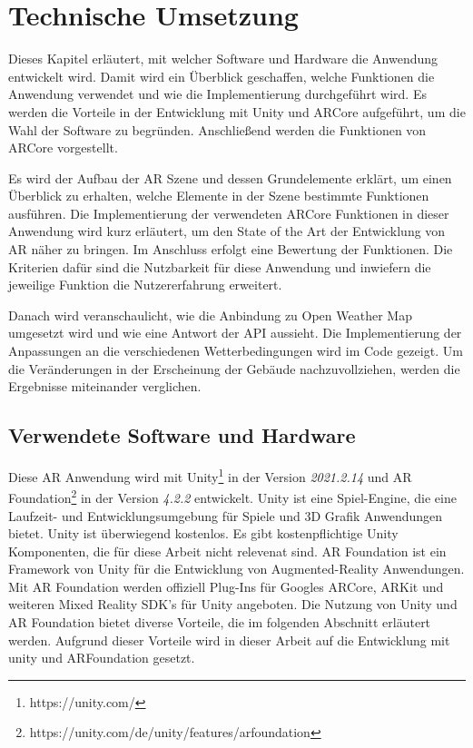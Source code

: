 \section{Technische Umsetzung}
\label{technische-umsetzung}
Dieses Kapitel erläutert, mit welcher Software und Hardware die Anwendung entwickelt wird. Damit wird ein Überblick geschaffen, welche Funktionen die Anwendung verwendet und wie die Implementierung durchgeführt wird. Es werden die Vorteile in der Entwicklung mit Unity und ARCore aufgeführt, um die Wahl der Software zu begründen. Anschließend werden die Funktionen von ARCore vorgestellt. 

Es wird der Aufbau der AR Szene und dessen Grundelemente erklärt, um einen Überblick zu erhalten, welche Elemente in der Szene bestimmte Funktionen ausführen. Die Implementierung der verwendeten ARCore Funktionen in dieser Anwendung wird kurz erläutert, um den State of the Art der Entwicklung von AR näher zu bringen. Im Anschluss erfolgt eine Bewertung der Funktionen. Die Kriterien dafür sind die Nutzbarkeit für diese Anwendung und inwiefern die jeweilige Funktion die Nutzererfahrung erweitert.

Danach wird veranschaulicht, wie die Anbindung zu Open Weather Map umgesetzt wird und wie eine Antwort der API aussieht. Die Implementierung der Anpassungen an die verschiedenen Wetterbedingungen wird im Code gezeigt. Um die Veränderungen in der Erscheinung der Gebäude nachzuvollziehen, werden die Ergebnisse miteinander verglichen.

\subsection{Verwendete Software und Hardware}
\label{technsich-umsetzung-verwendete-software-hardware}
Diese AR Anwendung wird mit Unity\footnote{https://unity.com/} in der Version \textit{2021.2.14} und AR Foundation\footnote{https://unity.com/de/unity/features/arfoundation} in der Version \textit{4.2.2} entwickelt. Unity ist eine Spiel-Engine, die eine Laufzeit- und Entwicklungsumgebung für Spiele und 3D Grafik Anwendungen bietet. Unity ist überwiegend kostenlos. Es gibt kostenpflichtige Unity Komponenten, die für diese Arbeit nicht relevenat sind. AR Foundation ist ein Framework von Unity für die Entwicklung von Augmented-Reality Anwendungen. Mit AR Foundation werden offiziell Plug-Ins für Googles ARCore, ARKit und weiteren Mixed Reality SDK's für Unity angeboten. Die Nutzung von Unity und AR Foundation bietet diverse Vorteile, die im folgenden Abschnitt erläutert werden. Aufgrund dieser Vorteile wird in dieser Arbeit auf die Entwicklung mit unity und ARFoundation gesetzt.

